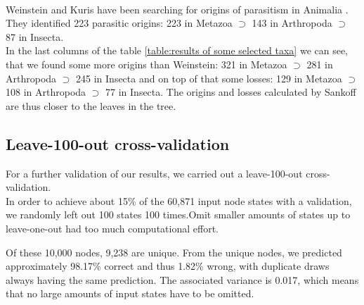 \begin{table}
\begin{center}
\begin{tabular}
            \hline
          \end{tabular} 
        \end{center}
        \caption{Results of some selected taxa (subtrees). \\
          (1 + 2) subtree taxa and name; 
          (3 + 4) number of internal nodes and leaf nodes; 
          (5 + 6) number or percentage of known states; 
          (7 - 9) number or percentage of predicted states; 
          (10) predicted state of the root node of the subtree; 
          (11 + 12) origins and losses with rounded states.}
          \label{table:results of some selected taxa}
      \end{table}

~ \\

      Weinstein and Kuris have been searching for origins of parasitism in Animalia \cite{Weinstein2016}. 
        They identified 223 parasitic origins: 223 in Metazoa $\supset$ 143 in Arthropoda $\supset$ 87 
        in Insecta. \\
      In the last columns of the table \ref{table:results of some selected taxa} we can see, that we 
        found some more origins than Weinstein: 321 in Metazoa $\supset$ 281 in Arthropoda $\supset$ 245 
        in Insecta and on top of that some losses: 129 in Metazoa $\supset$ 108 in Arthropoda $\supset$ 
        77 in Insecta. The origins and losses calculated by Sankoff are thus closer to the leaves in the tree.

    \subsection{Leave-100-out cross-validation} \label{sec:results - cross-validation}
      For a further validation of our results, we carried out a leave-100-out cross-validation. \\
      In order to achieve about 15\% of the 60,871 input node states with a validation, 
        we randomly left out 100 states 100 times.Omit smaller amounts of states up to leave-one-out had 
        too much computational effort.
        
      Of these 10,000 nodes, 9,238 are unique. From the unique nodes, we predicted approximately 
        98.17\% correct and thus 1.82\% wrong, with duplicate draws always having the same prediction. 
        The associated variance is 0.017, which means that no large amounts of input states have to be 
        omitted.
      
